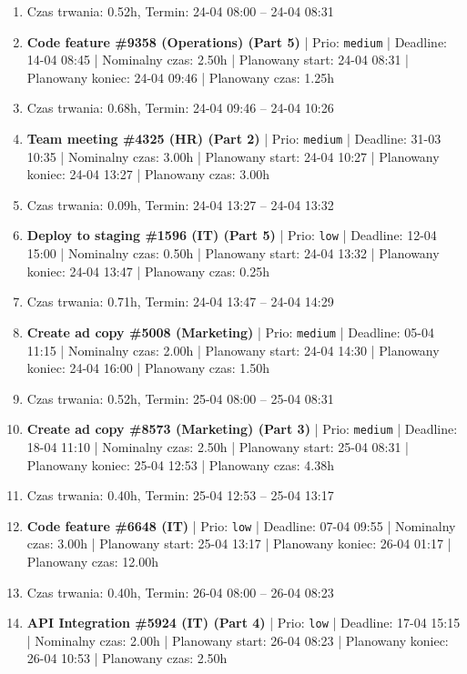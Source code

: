 {\begin{enumerate}
  \item [\textbf{PRZERWA}] Czas trwania: 0.52h, Termin: 24-04 08:00 -- 24-04 08:31
  \item [\textbf{14661}] \textbf{Code feature \#9358 (Operations) (Part 5)} | Prio: \texttt{medium} | Deadline: 14-04 08:45 | Nominalny czas: 2.50h | Planowany start: 24-04 08:31 | Planowany koniec: 24-04 09:46 | Planowany czas: 1.25h
  \item [\textbf{PRZERWA}] Czas trwania: 0.68h, Termin: 24-04 09:46 -- 24-04 10:26
  \item [\textbf{14641}] \textbf{Team meeting \#4325 (HR) (Part 2)} | Prio: \texttt{medium} | Deadline: 31-03 10:35 | Nominalny czas: 3.00h | Planowany start: 24-04 10:27 | Planowany koniec: 24-04 13:27 | Planowany czas: 3.00h
  \item [\textbf{PRZERWA}] Czas trwania: 0.09h, Termin: 24-04 13:27 -- 24-04 13:32
  \item [\textbf{14692}] \textbf{Deploy to staging \#1596 (IT) (Part 5)} | Prio: \texttt{low} | Deadline: 12-04 15:00 | Nominalny czas: 0.50h | Planowany start: 24-04 13:32 | Planowany koniec: 24-04 13:47 | Planowany czas: 0.25h
  \item [\textbf{PRZERWA}] Czas trwania: 0.71h, Termin: 24-04 13:47 -- 24-04 14:29
  \item [\textbf{14666}] \textbf{Create ad copy \#5008 (Marketing)} | Prio: \texttt{medium} | Deadline: 05-04 11:15 | Nominalny czas: 2.00h | Planowany start: 24-04 14:30 | Planowany koniec: 24-04 16:00 | Planowany czas: 1.50h
  \item [\textbf{PRZERWA}] Czas trwania: 0.52h, Termin: 25-04 08:00 -- 25-04 08:31
  \item [\textbf{14677}] \textbf{Create ad copy \#8573 (Marketing) (Part 3)} | Prio: \texttt{medium} | Deadline: 18-04 11:10 | Nominalny czas: 2.50h | Planowany start: 25-04 08:31 | Planowany koniec: 25-04 12:53 | Planowany czas: 4.38h
  \item [\textbf{PRZERWA}] Czas trwania: 0.40h, Termin: 25-04 12:53 -- 25-04 13:17
  \item [\textbf{14683}] \textbf{Code feature \#6648 (IT)} | Prio: \texttt{low} | Deadline: 07-04 09:55 | Nominalny czas: 3.00h | Planowany start: 25-04 13:17 | Planowany koniec: 26-04 01:17 | Planowany czas: 12.00h
  \item [\textbf{PRZERWA}] Czas trwania: 0.40h, Termin: 26-04 08:00 -- 26-04 08:23
  \item [\textbf{14696}] \textbf{API Integration \#5924 (IT) (Part 4)} | Prio: \texttt{low} | Deadline: 17-04 15:15 | Nominalny czas: 2.00h | Planowany start: 26-04 08:23 | Planowany koniec: 26-04 10:53 | Planowany czas: 2.50h

\end{enumerate}}
